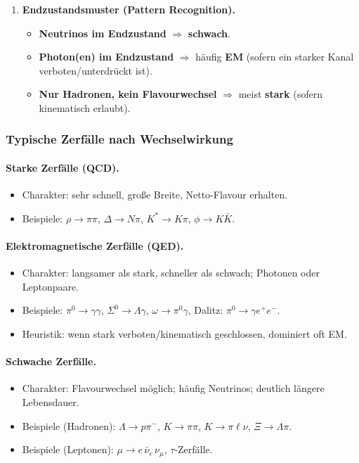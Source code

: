 \documentclass[10pt, letterpaper]{article}
\begin{document}
\begin{enumerate}
\item \textbf{Endzustandsmuster (Pattern Recognition).}\\
\begin{itemize}
\item \textbf{Neutrinos im Endzustand} $\Rightarrow$ \textbf{schwach}.
\item \textbf{Photon(en) im Endzustand} $\Rightarrow$ häufig \textbf{EM}
(sofern ein starker Kanal verboten/unterdrückt ist).
\item \textbf{Nur Hadronen, kein Flavourwechsel} $\Rightarrow$ meist \textbf{stark}
(sofern kinematisch erlaubt).
\end{itemize}
\end{enumerate}

\subsubsection*{Typische Zerfälle nach Wechselwirkung}

\paragraph{Starke Zerfälle (QCD).}
\begin{itemize}
\item Charakter: sehr schnell, große Breite, Netto-Flavour erhalten.
\item Beispiele: $\rho\to\pi\pi$, $\Delta\to N\pi$, $K^*\to K\pi$, $\phi\to K\bar K$.
\end{itemize}

\paragraph{Elektromagnetische Zerfälle (QED).}
\begin{itemize}
\item Charakter: langsamer als stark, schneller als schwach; Photonen oder Leptonpaare.
\item Beispiele: $\pi^0\to\gamma\gamma$, $\Sigma^0\to\Lambda\gamma$, $\omega\to\pi^0\gamma$,
Dalitz: $\pi^0\to \gamma e^+e^-$.
\item Heuristik: wenn stark verboten/kinematisch geschlossen, dominiert oft EM.
\end{itemize}

\paragraph{Schwache Zerfälle.}
\begin{itemize}
\item Charakter: Flavourwechsel möglich; häufig Neutrinos; deutlich längere Lebensdauer.
\item Beispiele (Hadronen): $\Lambda\to p\pi^-$, $K\to\pi\pi$, $K\to \pi \ell\nu$, $\Xi\to\Lambda\pi$.
\item Beispiele (Leptonen): $\mu\to e\,\bar\nu_e\,\nu_\mu$, $\tau$-Zerfälle.
\end{itemize}
\end{document}
